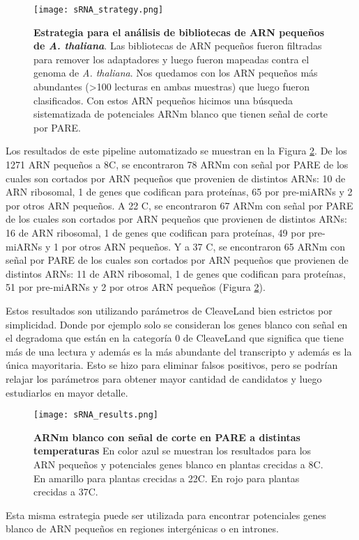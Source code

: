 \begin{figure}[htbp!] 
    \centering    
    \texttt{[image: sRNA\_strategy.png]}
    \caption[Estrategia para el análisis de bibliotecas de ARN pequeños de \textit{A. thaliana}]
    {
    \textbf{Estrategia para el análisis de bibliotecas de ARN pequeños de \textit{A. thaliana}}.
    Las bibliotecas de ARN pequeños fueron filtradas para remover los adaptadores y luego fueron mapeadas contra el genoma de \textit{A. thaliana}.
    Nos quedamos con los ARN pequeños más abundantes (>100 lecturas en ambas muestras) que luego fueron clasificados.
    Con estos ARN pequeños hicimos una búsqueda sistematizada de potenciales ARNm blanco que tienen señal de corte por PARE.
    }
     \label{fig:sRNA_strategy}
\end{figure}

Los resultados de este pipeline automatizado se muestran en la Figura \ref{fig:sRNA_results}.
De los 1271 ARN pequeños a  8\degree C, se encontraron 78 ARNm con señal por PARE de los cuales son cortados por ARN pequeños que provenien de distintos ARNs: 10 de ARN ribosomal, 1 de genes que codifican para proteínas, 65 por pre-miARNs y 2 por otros ARN pequeños.
A 22 \degree C, se encontraron 67 ARNm con señal por PARE de los cuales son cortados por ARN pequeños que provienen de distintos ARNs: 16 de ARN ribosomal, 1 de genes que codifican para proteínas, 49 por pre-miARNs y 1 por otros ARN pequeños. 
Y a 37 \degree C, se encontraron 65 ARNm con señal por PARE de los cuales son cortados por ARN pequeños que provienen de distintos ARNs: 11 de ARN ribosomal, 1 de genes que codifican para proteínas, 51 por pre-miARNs y 2 por otros ARN pequeños (Figura \ref{fig:sRNA_results}).

Estos resultados son utilizando parámetros de CleaveLand bien estrictos por simplicidad.
Donde por ejemplo solo se consideran los genes blanco con señal en el degradoma que están en la categoría 0 de CleaveLand que significa que tiene más de una lectura y además es la más abundante del transcripto y además es la única mayoritaria.
Esto se hizo para eliminar falsos positivos, pero se podrían relajar los parámetros para obtener mayor cantidad de candidatos y luego estudiarlos en mayor detalle.

\begin{figure}[htbp!] 
    \centering    
    \texttt{[image: sRNA\_results.png]}
    \caption[ARNm blanco con señal de corte en PARE a distintas temperaturas]{
    \textbf{ARNm blanco con señal de corte en PARE a distintas temperaturas}
    En color azul se muestran los resultados para los ARN pequeños y potenciales genes blanco en plantas crecidas a 8\degree C.
    En amarillo para plantas crecidas a  22\degree C.
    En rojo para plantas crecidas a  37\degree C.
   }
     \label{fig:sRNA_results}
\end{figure}

Esta misma estrategia puede ser utilizada para encontrar potenciales genes blanco de ARN pequeños en regiones intergénicas o en intrones.
